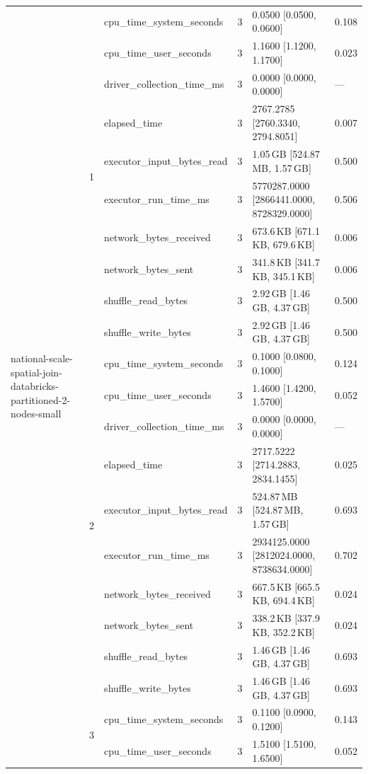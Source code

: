 \begin{tabular}{lllrll}
\multirow[t]{30}{*}{national-scale-spatial-join-databricks-partitioned-2-nodes-small} & \multirow[t]{10}{*}{1} & cpu_time_system_seconds & 3 & 0.0500 [0.0500, 0.0600] & 0.108 \\
 &  & cpu_time_user_seconds & 3 & 1.1600 [1.1200, 1.1700] & 0.023 \\
 &  & driver_collection_time_ms & 3 & 0.0000 [0.0000, 0.0000] & --- \\
 &  & elapsed_time & 3 & 2767.2785 [2760.3340, 2794.8051] & 0.007 \\
 &  & executor_input_bytes_read & 3 & 1.05\,GB [524.87\,MB, 1.57\,GB] & 0.500 \\
 &  & executor_run_time_ms & 3 & 5770287.0000 [2866441.0000, 8728329.0000] & 0.506 \\
 &  & network_bytes_received & 3 & 673.6\,KB [671.1\,KB, 679.6\,KB] & 0.006 \\
 &  & network_bytes_sent & 3 & 341.8\,KB [341.7\,KB, 345.1\,KB] & 0.006 \\
 &  & shuffle_read_bytes & 3 & 2.92\,GB [1.46\,GB, 4.37\,GB] & 0.500 \\
 &  & shuffle_write_bytes & 3 & 2.92\,GB [1.46\,GB, 4.37\,GB] & 0.500 \\
\cline{2-6}
 & \multirow[t]{10}{*}{2} & cpu_time_system_seconds & 3 & 0.1000 [0.0800, 0.1000] & 0.124 \\
 &  & cpu_time_user_seconds & 3 & 1.4600 [1.4200, 1.5700] & 0.052 \\
 &  & driver_collection_time_ms & 3 & 0.0000 [0.0000, 0.0000] & --- \\
 &  & elapsed_time & 3 & 2717.5222 [2714.2883, 2834.1455] & 0.025 \\
 &  & executor_input_bytes_read & 3 & 524.87\,MB [524.87\,MB, 1.57\,GB] & 0.693 \\
 &  & executor_run_time_ms & 3 & 2934125.0000 [2812024.0000, 8738634.0000] & 0.702 \\
 &  & network_bytes_received & 3 & 667.5\,KB [665.5\,KB, 694.4\,KB] & 0.024 \\
 &  & network_bytes_sent & 3 & 338.2\,KB [337.9\,KB, 352.2\,KB] & 0.024 \\
 &  & shuffle_read_bytes & 3 & 1.46\,GB [1.46\,GB, 4.37\,GB] & 0.693 \\
 &  & shuffle_write_bytes & 3 & 1.46\,GB [1.46\,GB, 4.37\,GB] & 0.693 \\
\cline{2-6}
 & \multirow[t]{10}{*}{3} & cpu_time_system_seconds & 3 & 0.1100 [0.0900, 0.1200] & 0.143 \\
 &  & cpu_time_user_seconds & 3 & 1.5100 [1.5100, 1.6500] & 0.052 \\

\end{tabular}

